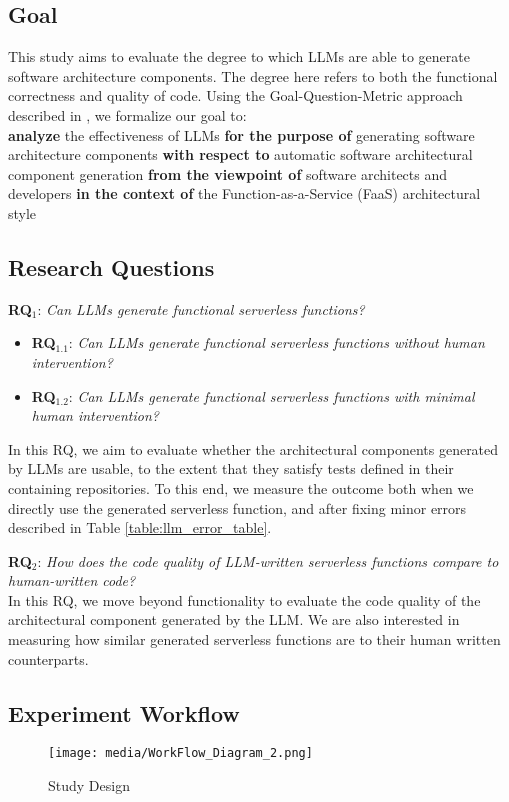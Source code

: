 \subsection{Goal}
This study aims to evaluate the degree to which LLMs are able to generate software architecture components. The degree here refers to both the functional correctness and quality of code. Using the Goal-Question-Metric approach described in \cite{caldiera1994goal}, we formalize our goal to:
\\
\textbf{analyze} the effectiveness of LLMs
\textbf{for the purpose of} generating software architecture components
\textbf{with respect to} automatic software architectural component generation
\textbf{from the viewpoint of} software architects and developers
\textbf{in the context of} the Function-as-a-Service (FaaS) architectural style

\subsection{Research Questions} \label{rqs}
\textbf{RQ$_{1}$}: \textit{Can LLMs generate functional serverless functions?} 
\begin{itemize}
    \item \textbf{RQ$_{1.1}$}: \textit{Can LLMs generate functional serverless functions without human intervention?} 
    \item \textbf{RQ$_{1.2}$}: \textit{Can LLMs generate functional serverless functions with minimal human intervention?}
\end{itemize} 
In this RQ, we aim to evaluate whether the architectural components generated by LLMs are usable, to the extent that they satisfy tests defined in their containing repositories. To this end, we measure the outcome both when we directly use the generated serverless function, and after fixing minor errors described in Table \ref{table:llm_error_table}.

\textbf{RQ$_{2}$}: \textit{How does the code quality of LLM-written serverless functions compare to human-written code?} \\
In this RQ, we move beyond functionality to evaluate the code quality of the architectural component generated by the LLM. We are also interested in measuring how similar generated serverless functions are to their human written counterparts.




\subsection{Experiment Workflow}
\begin{figure*}[htb!]
    \centering
    \texttt{[image: media/WorkFlow\_Diagram\_2.png]}
    \caption{Study Design}
    \label{fig:study-design}
\vspace{-13pt}
\end{figure*}

